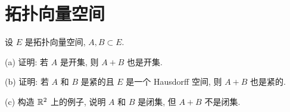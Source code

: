 \chapter{拓扑向量空间}
\thispagestyle{empty}


\setcounter{exer}{1}
\begin{exercise}
    设 $E$ 是拓扑向量空间, $A,B\subset E$.

    (a) 证明: 若 $A$ 是开集, 则 $A+B$ 也是开集.

    (b) 证明: 若 $A$ 和 $B$ 是紧的且 $E$ 是一个 Hausdorff 空间, 则 $A+B$ 也是紧的.

    (c) 构造 $\mathbb{R}^2$ 上的例子, 说明 $A$ 和 $B$ 是闭集, 但 $A+B$ 不是闭集.
\end{exercise}

